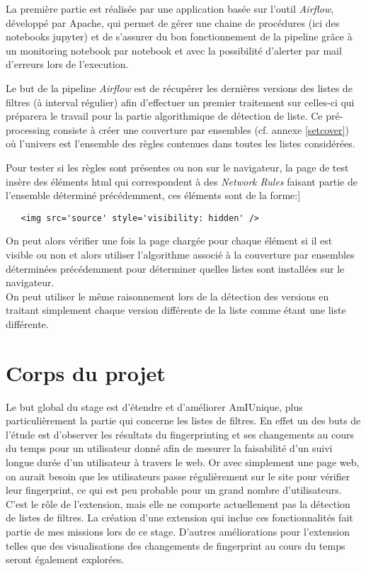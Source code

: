 \documentclass[oneside,a4paper,12pt]{article}
\begin{document}
La première partie est réalisée par une application basée sur l'outil \textit{Airflow}, développé par Apache, qui permet de gérer une chaine de procédures (ici des notebooks jupyter) et de s'assurer du bon fonctionnement de la pipeline grâce à un monitoring notebook par notebook et avec la possibilité d'alerter par mail d'erreurs lors de l'execution.

Le but de la pipeline \textit{Airflow} est de récupérer les dernières versions des listes de filtres (à interval régulier) afin d'effectuer un premier traitement sur celles-ci qui préparera le travail pour la partie algorithmique de détection de liste. Ce pré-processing consiste à créer une couverture par ensembles (cf. annexe \ref{setcover}) où l'univers est l'ensemble des règles contenues dans toutes les listes considérées.

Pour tester si les règles sont présentes ou non sur le navigateur, la page de test insère des éléments html qui correspondent à des \textit{Network Rules} faisant partie de l'ensemble déterminé précédemment, ces éléments sont de la forme:]
\begin{center}
\begin{lstlisting}
   <img src='source' style='visibility: hidden' />
\end{lstlisting}
\end{center}

On peut alors vérifier une fois la page chargée pour chaque élément si il est visible ou non et alors utiliser l'algorithme associé à la couverture par ensembles déterminées précédemment pour déterminer quelles listes sont installées sur le navigateur.\\

On peut utiliser le même raisonnement lors de la détection des versions en traitant simplement chaque version différente de la liste comme étant une liste différente.


\section{Corps du projet}\label{Projet}

Le but global du stage est d'étendre et d'améliorer AmIUnique, plus particulièrement la partie qui concerne les listes de filtres. En effet un des buts de l'étude est d'observer les résultats du fingerprinting et ses changements au cours du temps pour un utilisateur donné afin de mesurer la faisabilité d'un suivi longue durée d'un utilisateur à travers le web.
Or avec simplement une page web, on aurait besoin que les utilisateurs passe régulièrement sur le site pour vérifier leur fingerprint, ce qui est peu probable pour un grand nombre d'utilisateurs.
C'est le rôle de l'extension, mais elle ne comporte actuellement pas la détection de listes de filtres. La création d'une extension qui inclue ces fonctionnalités fait partie de mes missions lors de ce stage. D'autres améliorations pour l'extension telles que des visualisations des changements de fingerprint au cours du temps seront également explorées.
\end{document}
